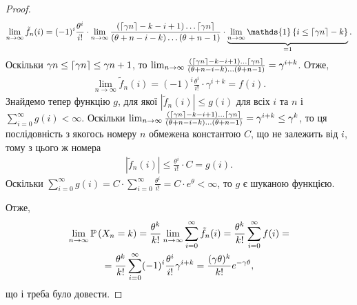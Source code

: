 \begin{proof}
    \begin{gather*}
        \lim_{n\to\infty} \tilde{f}_n(i) = (-1)^i \frac{\theta^i}{i!} \cdot
        \lim_{n\to\infty} \frac{
            (\ceil*{\g n} - k - i + 1) \dots \ceil*{\g n}
        }{
            (\theta + n - i - k) \dots (\theta + n - 1)
        } \cdot \underbrace{\lim_{n\to\infty} \mathds{1}\left\{i \leq \ceil*{\gamma n}-k\right\}}_{= 1}.
    \end{gather*}
    Оскільки $\gamma n \leq \ceil*{\gamma n} \leq \gamma n + 1$, то 
    $
    \lim_{n\to\infty} \frac{
        (\ceil*{\g n} - k - i + 1) \dots \ceil*{\g n}
    }{
        (\theta + n - i - k) \dots (\theta + n - 1)
    } = \gamma^{i + k}
    $. Отже, 
    \begin{gather*}
        \lim_{n\to\infty} \tilde{f}_n(i) = (-1)^i \frac{\theta^i}{i!} \cdot \gamma^{i + k} = f(i).
    \end{gather*}
    Знайдемо тепер функцію $g$, для якої $|\tilde{f}_n(i)| \leq g(i)$ для всіх $i$ та $n$
    і $\sum_{i=0}^{\infty} g(i) < \infty$.
    Оскільки 
    $
    \lim_{n\to\infty} \frac{
        (\ceil*{\g n} - k - i + 1) \dots \ceil*{\g n}
    }{
        (\theta + n - i - k) \dots (\theta + n - 1)
    } = \gamma^{i + k} \leq \gamma^k$, то 
    ця послідовність з якогось номеру $n$ обмежена константою $C$, що не залежить від $i$, тому
    з цього ж номера
    \begin{gather*}
        |\tilde{f}_n(i)| \leq \frac{\theta^i}{i!} \cdot C = g(i).
    \end{gather*}
    Оскільки $\sum_{i=0}^{\infty} g(i) = C \cdot \sum_{i=0}^{\infty} \frac{\theta^i}{i!} = C \cdot e^{\theta} < \infty$,
    то $g$ є шуканою функцією.

    Отже, 
    \begin{gather*}
        \lim_{n\to\infty} \P{X_n = k} = \frac{\theta^k}{k!} \lim_{n\to\infty} \sum_{i=0}^{\infty} \tilde{f}_n(i) =
        \frac{\theta^k}{k!} \sum_{i=0}^{\infty} f(i) = \\ = \frac{\theta^k}{k!} \sum_{i=0}^{\infty} (-1)^i \frac{\theta^i}{i!} \gamma^{i + k} = 
        \frac{(\gamma \theta)^k}{k!} e^{-\gamma \theta},
    \end{gather*}
    що і треба було довести.
\end{proof}

